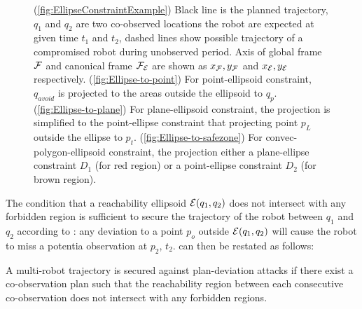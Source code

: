 \documentclass[10pt,twocolumn,twoside]{IEEEtran}
\newcommand{\news}{\color{blue}}
\begin{document}
\begin{figure}
    \caption{\news (\ref{fig:EllipseConstraintExample}) Black line is the planned trajectory, $q_1$ and $q_2$ are two co-observed locations the robot are expected at given time $t_1$ and $t_2$, dashed lines show possible trajectory of a compromised robot during unobserved period. Axis of global frame $\mathcal{F}$ and canonical frame $\mathcal{F}_{\mathcal{E}}$ are shown as $x_{\mathcal{F}}, y_{\mathcal{F}}$ and $x_{\mathcal{E}}, y_{\mathcal{E}}$ respectively. 
    (\ref{fig:Ellipse-to-point}) For point-ellipsoid constraint, $q_{avoid}$ is projected to the areas outside the ellipsoid to $q_{p}$. 
    (\ref{fig:Ellipse-to-plane}) For plane-ellipsoid constraint, the projection is simplified to the point-ellipse constraint that projecting point $p_{L}$ outside the ellipse to $p_{t}$.
    (\ref{fig:Ellipse-to-safezone}) For convec-polygon-ellipsoid constraint, the projection either a plane-ellipse constraint $D_{1}$ (for red region) or a point-ellipse constraint $D_{2}$ (for brown region).}
    \label{fig:Reachability_full}
  \end{figure}

{\news The condition that a reachability ellipsoid $\mathcal{E}(q_1,q_2)$ does not intersect with any forbidden region is sufficient to secure the trajectory of the robot between $q_1$ and $q_2$ according to : any deviation to a point $p_o$ outside $\mathcal{E}(q_1,q_2)$ will cause the robot to miss a potentia observation at $p_2$, $t_2$.  can then be restated as follows:
\begin{definition}\label{rmk:revised-security}
  A multi-robot trajectory is secured against plan-deviation attacks if there exist a co-observation plan such that the reachability region between each consecutive co-observation does not intersect with any forbidden regions.
\end{definition}
}
\end{document}
